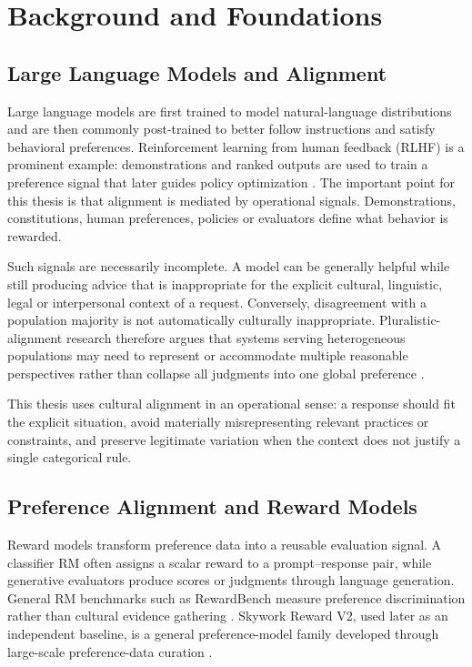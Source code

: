 \chapter{Background and Foundations}
\label{ch:background}

\section{Large Language Models and Alignment}

Large language models are first trained to model natural-language distributions and are then commonly post-trained to better follow instructions and satisfy behavioral preferences. Reinforcement learning from human feedback (RLHF) is a prominent example: demonstrations and ranked outputs are used to train a preference signal that later guides policy optimization \parencite{ouyang2022instructgpt}. The important point for this thesis is that alignment is mediated by operational signals. Demonstrations, constitutions, human preferences, policies or evaluators define what behavior is rewarded.

Such signals are necessarily incomplete. A model can be generally helpful while still producing advice that is inappropriate for the explicit cultural, linguistic, legal or interpersonal context of a request. Conversely, disagreement with a population majority is not automatically culturally inappropriate. Pluralistic-alignment research therefore argues that systems serving heterogeneous populations may need to represent or accommodate multiple reasonable perspectives rather than collapse all judgments into one global preference \parencite{sorensen2024pluralistic}.

This thesis uses cultural alignment in an operational sense: a response should fit the explicit situation, avoid materially misrepresenting relevant practices or constraints, and preserve legitimate variation when the context does not justify a single categorical rule.

\section{Preference Alignment and Reward Models}

Reward models transform preference data into a reusable evaluation signal. A classifier RM often assigns a scalar reward to a prompt--response pair, while generative evaluators produce scores or judgments through language generation. General RM benchmarks such as RewardBench measure preference discrimination rather than cultural evidence gathering \parencite{lambert2025rewardbench}. Skywork Reward V2, used later as an independent baseline, is a general preference-model family developed through large-scale preference-data curation \parencite{liu2026skyworkrewardv2}.

